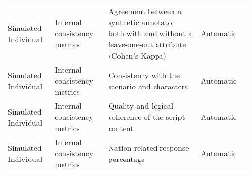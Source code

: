 \begin{small}
\begin{center}
\begin{longtable}{@{}p{}p{}p{}p{}p{}@{}}
Simulated Individual     & Internal consistency metrics        & Agreement between a synthetic annotator both with and without a leave-one-out attribute (Cohen's Kappa)                                                                                                     & Automatic & \cite{castricato2024personareproducibletestbedpluralistic}                                                                                                                                                                                                                                                                                                                                                                                         \\
Simulated Individual     & Internal consistency metrics        & Consistency with the scenario and characters                                                                                                                                                                & Automatic & \cite{Zhang2024SpeechAgentsHS}                                                                                                                                                                                                                                                                                                                                                                                                   \\
Simulated Individual     & Internal consistency metrics        & Quality and logical coherence of the script content                                                                                                                                                         & Automatic & \cite{Zhang2024SpeechAgentsHS}                                                                                                                                                                                                                                                                                                                                                                                                   \\
Simulated Individual     & Internal consistency metrics        & Nation-related response percentage                                                                                                                                                                          & Automatic & \cite{kamruzzaman2024exploringchangesnationperception}                                                                                                                                                                                                                                                                                                                                                                                            \\

\end{longtable}
\end{center}
\end{small}
